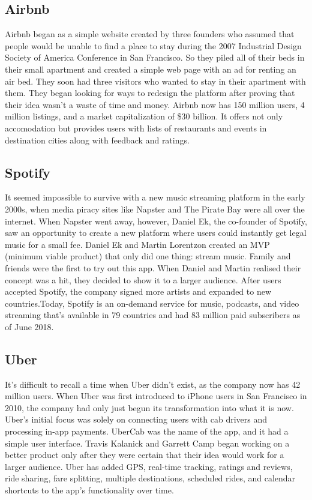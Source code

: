 \documentclass[paper=a4, fontsize=11pt]{scrartcl}
\numberwithin{equation}{section}		%
\numberwithin{figure}{section}			%
\numberwithin{table}{section}				%
\begin{document}
\subsection{Airbnb}
Airbnb began as a simple website created by three founders who assumed that people would be unable to find a place to stay during the 2007 Industrial Design Society of America Conference in San Francisco. So they piled all of their beds in their small apartment and created a simple web page with an ad for renting an air bed. They soon had three visitors who wanted to stay in their apartment with them. They began looking for ways to redesign the platform after proving that their idea wasn't a waste of time and money. Airbnb now has 150 million users, 4 million listings, and a market capitalization of \$30 billion. It offers not only accomodation but provides users with lists of restaurants and events in destination cities along with feedback and ratings.

\subsection{Spotify}
It seemed impossible to survive with a new music streaming platform in the early 2000s, when media piracy sites like Napster and The Pirate Bay were all over the internet. When Napster went away, however, Daniel Ek, the co-founder of Spotify, saw an opportunity to create a new platform where users could instantly get legal music for a small fee. Daniel Ek and Martin Lorentzon created an MVP (minimum viable product) that only did one thing: stream music. Family and friends were the first to try out this app. When Daniel and Martin realised their concept was a hit, they decided to show it to a larger audience. After users accepted Spotify, the company signed more artists and expanded to new countries.Today, Spotify is an on-demand service for music, podcasts, and video streaming that’s available in 79 countries and had 83 million paid subscribers as of June 2018.

\subsection{Uber}
It's difficult to recall a time when Uber didn't exist, as the company now has 42 million users. When Uber was first introduced to iPhone users in San Francisco in 2010, the company had only just begun its transformation into what it is now. Uber's initial focus was solely on connecting users with cab drivers and processing in-app payments. UberCab was the name of the app, and it had a simple user interface. Travis Kalanick and Garrett Camp began working on a better product only after they were certain that their idea would work for a larger audience. Uber has added GPS, real-time tracking, ratings and reviews, ride sharing, fare splitting, multiple destinations, scheduled rides, and calendar shortcuts to the app's functionality over time.
\end{document}
